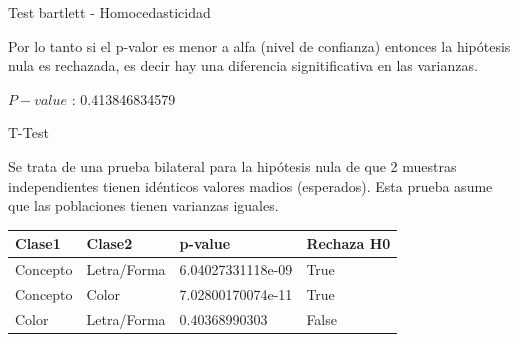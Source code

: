 \documentclass{beamer}
\begin{document}
\begin{frame}{Test bartlett - Homocedasticidad}


Por lo tanto si el p-valor es menor a alfa (nivel de confianza) entonces la hipótesis nula es rechazada, es decir hay una diferencia signitificativa en las varianzas.

$P-value$ : 0.413846834579

\end{frame}

\begin{frame}{T-Test}

Se trata de una prueba bilateral para la hipótesis nula de que 2 muestras independientes tienen idénticos valores madios (esperados). Esta prueba asume que las poblaciones tienen varianzas iguales.

\begin{center}
    \begin{tabular}{ | p{2cm} | p{2cm} | p{3.5cm} | p{2cm} |}
    \hline
     Clase1       &  Clase2 			&  p-value               & Rechaza H0		\\ 
    \hline
     Concepto    &  Letra/Forma	    &  6.04027331118e-09     & True 				\\ 
     Concepto    &  Color 			&  7.02800170074e-11   	 & True				\\ 
     Color 		 &  Letra/Forma     &  0.40368990303         & False 				\\ 
    \hline
    \end{tabular}
\end{center} 

\end{frame}


\end{document}
